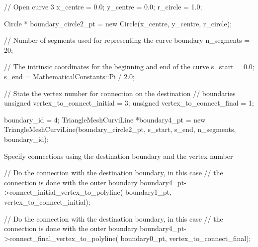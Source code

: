  
\begin{DoxyCodeInclude}
  \textcolor{comment}{// Open curve 3}
  x\_centre = 0.0;
  y\_centre = 0.0;
  r\_circle = 1.0;

  Circle * boundary\_circle2\_pt = \textcolor{keyword}{new} Circle(x\_centre, y\_centre, r\_circle);

  \textcolor{comment}{// Number of segments used for representing the curve boundary}
  n\_segments = 20;

  \textcolor{comment}{// The intrinsic coordinates for the beginning and end of the curve}
  s\_start = 0.0;
  s\_end = MathematicalConstants::Pi / 2.0;

  \textcolor{comment}{// State the vertex number for connection on the destination}
  \textcolor{comment}{// boundaries}
  \textcolor{keywordtype}{unsigned} vertex\_to\_connect\_initial = 3;
  \textcolor{keywordtype}{unsigned} vertex\_to\_connect\_final = 1;

  boundary\_id = 4;
  TriangleMeshCurviLine *boundary4\_pt =
      \textcolor{keyword}{new} TriangleMeshCurviLine(boundary\_circle2\_pt,
          s\_start,
          s\_end,
          n\_segments,
          boundary\_id);

\end{DoxyCodeInclude}



\begin{DoxyItemize}
\item Specify connections using the destination boundary and the vertex number
\end{DoxyItemize}

 
\begin{DoxyCodeInclude}
  \textcolor{comment}{// Do the connection with the destination boundary, in this case}
  \textcolor{comment}{// the connection is done with the outer boundary}
  boundary4\_pt->connect\_initial\_vertex\_to\_polyline(
                                boundary1\_pt,
                                vertex\_to\_connect\_initial);

  \textcolor{comment}{// Do the connection with the destination boundary, in this case}
  \textcolor{comment}{// the connection is done with the outer boundary}
  boundary4\_pt->connect\_final\_vertex\_to\_polyline(
                                boundary0\_pt,
                                vertex\_to\_connect\_final);

\end{DoxyCodeInclude}



